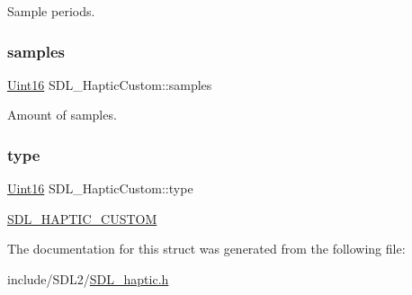 Sample periods. \mbox{\label{struct_s_d_l___haptic_custom_a5905ea1b6182da846535ca8c80b4fa33}} 
\subsubsection{\texorpdfstring{samples}{samples}}
{\footnotesize\ttfamily \hyperlink{_s_d_l__stdinc_8h_a31fcc0a076c9068668173ee26d33e42b}{Uint16} S\+D\+L\+\_\+\+Haptic\+Custom\+::samples}

Amount of samples. \mbox{\label{struct_s_d_l___haptic_custom_a98a8995c94492069dc007502ed97eed2}} 
\subsubsection{\texorpdfstring{type}{type}}
{\footnotesize\ttfamily \hyperlink{_s_d_l__stdinc_8h_a31fcc0a076c9068668173ee26d33e42b}{Uint16} S\+D\+L\+\_\+\+Haptic\+Custom\+::type}

\hyperlink{_s_d_l__haptic_8h_a8a18c4de1076ac9bebd718329d16db29}{S\+D\+L\+\_\+\+H\+A\+P\+T\+I\+C\+\_\+\+C\+U\+S\+T\+OM} 

The documentation for this struct was generated from the following file\+:\begin{DoxyCompactItemize}
\item 
include/\+S\+D\+L2/\hyperlink{_s_d_l__haptic_8h}{S\+D\+L\+\_\+haptic.\+h}\end{DoxyCompactItemize}
